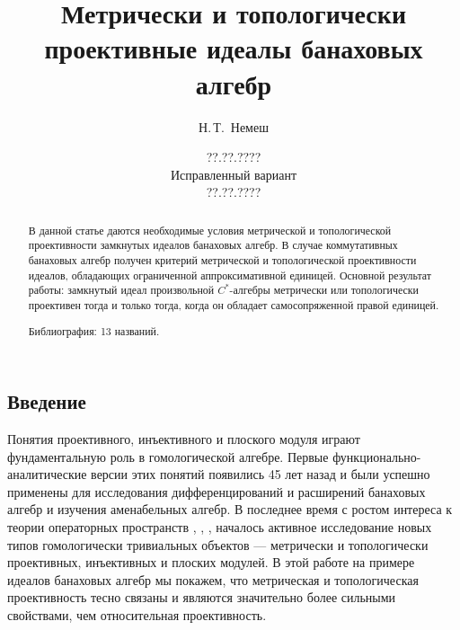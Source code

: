 \documentclass[12pt]{article}
\numberwithin{equation}{subsection}
\theoremstyle{plain}
\begin{document}

\date{??.??.????\\
Исправленный вариант\\ ??.??.????}

\author{Н.\,Т.~Немеш}
\address{Московский государственный университет \\им. М. В. Ломоносова}

\title{Метрически и топологически проективные идеалы банаховых алгебр}

\maketitle

\begin{fulltext}
\begin{abstract}

В данной статье даются необходимые условия метрической и топологической проективности замкнутых идеалов банаховых алгебр. В случае коммутативных банаховых алгебр получен критерий метрической и топологической проективности идеалов, обладающих ограниченной аппроксимативной единицей. Основной результат работы: замкнутый идеал произвольной $C^*$-алгебры метрически или топологически проективен тогда и только тогда, когда он обладает самосопряженной правой единицей.

Библиография: 13 названий.
\end{abstract}


\section{Введение}\label{MetricAndTopologicalProjectivity}

Понятия проективного, инъективного и плоского модуля играют фундаментальную роль в гомологической алгебре. Первые функционально-аналитические версии этих понятий появились 45 лет назад \cite{HelemHomolDimNorModBanAlg} и были успешно применены для исследования дифференцирований и расширений банаховых алгебр и изучения аменабельных алгебр. В последнее время с ростом интереса к теории операторных пространств \cite{WittstockOpVersionHahnBanachTh}, \cite{EffOzawRuanInjAndNuclOpSp}, \cite{ForrestProjOpSpAlmstPeriodAndComplCmplmntdIdInFourierAlg}, началось активное исследование новых типов гомологически тривиальных объектов --- метрически и топологически проективных, инъективных и плоских модулей. В этой работе на примере идеалов банаховых алгебр мы покажем, что метрическая и топологическая проективность тесно связаны и являются значительно более сильными свойствами, чем относительная проективность.


\end{fulltext}
\end{document}
